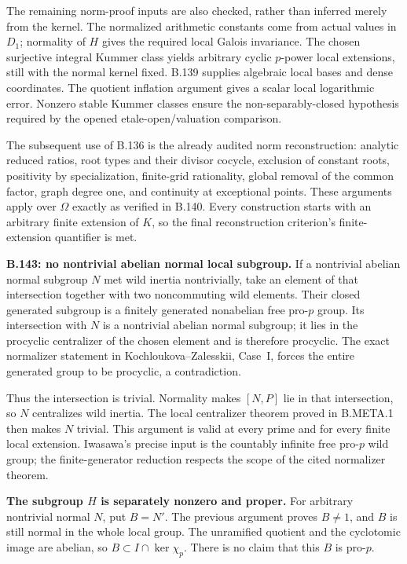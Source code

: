 The remaining norm-proof inputs are also checked,
rather than inferred merely from the kernel.
The normalized arithmetic constants come from
actual values in $D_1$; normality of $H$ gives the
required local Galois invariance.  The chosen
surjective integral Kummer class yields arbitrary
cyclic $p$-power local extensions, still with the
normal kernel fixed.  B.139 supplies algebraic
local bases and dense coordinates.  The quotient
inflation argument gives a scalar local logarithmic
error.  Nonzero stable Kummer classes ensure the
non-separably-closed hypothesis required by the
opened etale-open/valuation comparison.

The subsequent use of B.136 is the already audited
norm reconstruction: analytic reduced ratios,
root types and their divisor cocycle, exclusion of
constant roots, positivity by specialization,
finite-grid rationality, global removal of the
common factor, graph degree one, and continuity
at exceptional points.  These arguments apply
over $\Omega$ exactly as verified in B.140.
Every construction starts with an arbitrary finite
extension of $K$, so the final reconstruction
criterion's finite-extension quantifier is met.

\medskip\noindent\textbf{B.143: no nontrivial abelian normal local subgroup.}
If a nontrivial abelian normal subgroup $N$ met
wild inertia nontrivially, take an element of
that intersection together with two noncommuting
wild elements.  Their closed generated subgroup
is a finitely generated nonabelian free pro-$p$
group.  Its intersection with $N$ is a nontrivial
abelian normal subgroup; it lies in the procyclic
centralizer of the chosen element and is therefore
procyclic.  The exact normalizer statement in
Kochloukova--Zalesskii, Case~I, forces the entire
generated group to be procyclic, a contradiction.

Thus the intersection is trivial.  Normality makes
$[N,P]$ lie in that intersection, so $N$ centralizes
wild inertia.  The local centralizer theorem
proved in B.META.1 then makes $N$ trivial.  This
argument is valid at every prime and for every
finite local extension.  Iwasawa's precise input
is the countably infinite free pro-$p$ wild group;
the finite-generator reduction respects the scope
of the cited normalizer theorem.

\medskip\noindent\textbf{The subgroup $H$ is separately nonzero and proper.}
For arbitrary nontrivial normal $N$, put $B=N'$.
The previous argument proves $B\ne1$, and $B$
is still normal in the whole local group.  The
unramified quotient and the cyclotomic image are
abelian, so $B\subset I\cap\ker\chi_p$.
There is no claim that this $B$ is pro-$p$.

